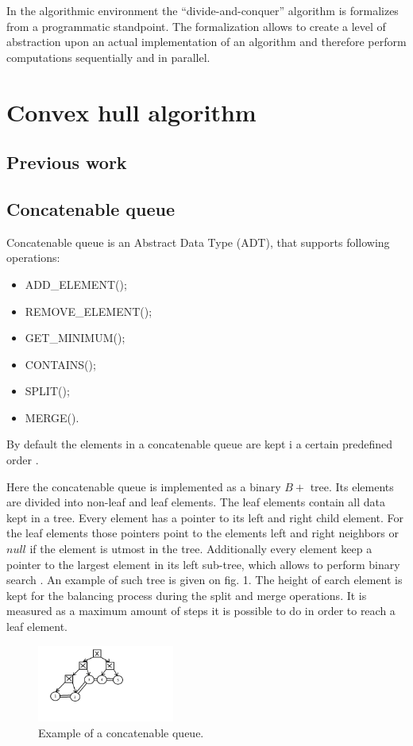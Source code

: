 \documentclass[conference]{IEEEtran}
\theoremstyle{plane}
\begin{document}
In the algorithmic environment the ``divide-and-conquer'' algorithm is formalizes from a programmatic standpoint. The formalization allows to create a level of abstraction upon an actual implementation of an algorithm and therefore perform computations sequentially and in parallel.

\section{Convex hull algorithm}
\subsection{Previous work}

\subsection{Concatenable queue}

Concatenable queue is an Abstract Data Type (ADT), that supports following operations:

\begin{itemize}
	\item
	ADD\_ELEMENT();
	\item
	REMOVE\_ELEMENT();
	\item
	GET\_MINIMUM();
	\item
	CONTAINS();
	\item
	SPLIT();
	\item
	MERGE().
\end{itemize}

By default the elements in a concatenable queue are kept i a certain predefined order \cite{aho}.

Here the concatenable queue is implemented as a binary  $B+$ tree. Its elements are divided into non-leaf and leaf elements. The leaf elements contain all data kept in a tree. Every element has a pointer to its left and right child element. For the leaf elements those pointers point to the elements left and right neighbors or $null$ if the element is utmost in the tree. 
Additionally every element keep a pointer to the largest element in its left sub-tree, which  allows to perform binary search \cite{aho}.  An example of such tree is given on fig. 1. The height of earch element is kept for the balancing process during the split and merge operations. It is measured as a maximum amount of steps it is possible to do in order to reach a leaf element.

\begin{figure}[htbp]
	\centerline{\includegraphics[width=0.4\textwidth, height=0.2\textheight]{cq_example}}
	\caption{Example of a concatenable queue.}
	\label{cq_example}
\end{figure}
\end{document}
